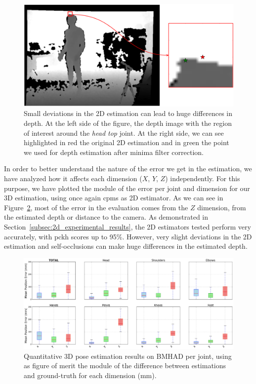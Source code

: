 \begin{figure}[h]
    \centering
    \includegraphics[width=\textwidth]{figures/head.png}
    \caption{Small deviations in the 2D estimation can lead to huge differences in depth. At the left side of the figure, the depth image with the region of interest around the \textit{head top} joint. At the right side, we can see highlighted in red the original 2D estimation and in green the point we used for depth estimation after minima filter correction.}
    \label{fig:head}
\end{figure}

In order to better understand the nature of the error we get in the estimation, we have analyzed how it affects each dimension (\(X\), \(Y\), \(Z\)) independently. For this purpose, we have plotted the module of the error per joint and dimension for our 3D estimation, using once again \glspl{cpm} as 2D estimator. As we can see in Figure~\ref{fig:mpjpe_by_dim}, most of the error in the evaluation comes from the \(Z\) dimension, \ie from the estimated depth or distance to the camera. As demonstrated in Section~\ref{subsec:2d_experimental_results}, the 2D estimators tested perform very accurately, with \gls{pckh} scores up to 95\%. However, very slight deviations in the 2D estimation and self-occlusions can make huge differences in the estimated depth.

\begin{figure}[h]
    \centering
    \includegraphics[width=\textwidth]{figures/mpjpe-xyz-ours.png}
    \caption{Quantitative 3D pose estimation results on BMHAD per joint, using as figure of merit the module of the difference between estimations and ground-truth for each dimension (mm).}
    \label{fig:mpjpe_by_dim}
\end{figure}

